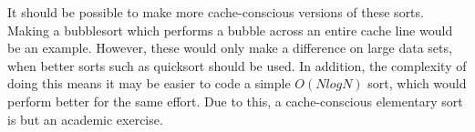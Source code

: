 It should be possible to make more cache-conscious versions of these sorts.
Making a bubblesort which performs a bubble across an entire cache line would
be an example. However, these would only make a difference on large data sets,
when better sorts such as quicksort should be used. In addition, the complexity
of doing this means it may be easier to code a simple $O(NlogN)$ sort, which
would perform better for the same effort. Due to this, a cache-conscious
elementary sort is but an academic exercise.
